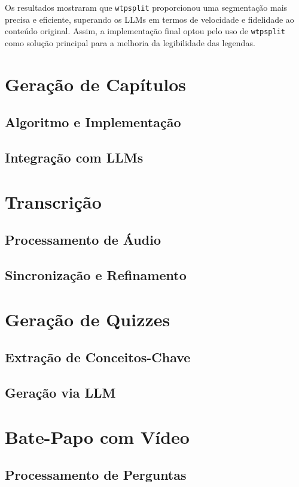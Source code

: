 \documentclass[tcc,capa]{texufpel}
\begin{document}
Os resultados mostraram que \texttt{wtpsplit} proporcionou uma segmentação mais precisa e eficiente, superando os LLMs em termos de velocidade e fidelidade ao conteúdo original. Assim, a implementação final optou pelo uso de \texttt{wtpsplit} como solução principal para a melhoria da legibilidade das legendas.





\section{Geração de Capítulos}
\subsection{Algoritmo e Implementação}
\subsection{Integração com LLMs}

\section{Transcrição}
\subsection{Processamento de Áudio}
\subsection{Sincronização e Refinamento}

\section{Geração de Quizzes}
\subsection{Extração de Conceitos-Chave}
\subsection{Geração via LLM}

\section{Bate-Papo com Vídeo}
\subsection{Processamento de Perguntas}
\end{document}
